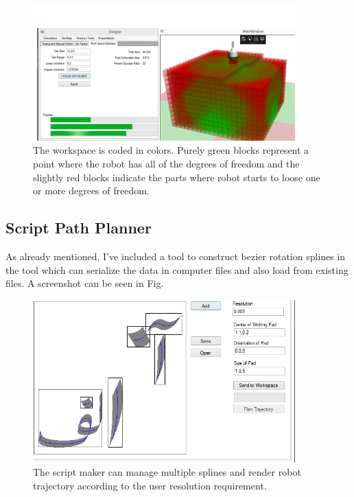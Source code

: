 {        \begin{figure}
          \centering
          \includegraphics[width=0.9\textwidth]{WorkSpaceOptimer.png}
          \caption{The workspace is coded in colors. Purely green blocks represent a point where the robot has all of the degrees of freedom and the slightly red blocks indicate the parts where robot starts to loose one or more degrees of freedom.
          } \label{FigWorkspace}
        \end{figure}
    \subsection{Script Path Planner}
    As already mentioned, I've included a tool to construct bezier rotation splines in the tool which can serialize the data in computer files and also load from existing files. A screenshot can be seen in Fig.

        \begin{figure}
          \centering
          \includegraphics[width=0.9\textwidth]{SctiptEditor.png}
          \caption{The script maker can manage multiple splines and render robot trajectory according to the user resolution requirement.
          } \label{FigWorkspace}
        \end{figure}
}
